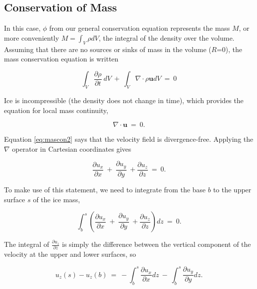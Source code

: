 \subsection{Conservation of Mass}

In this case, $\phi$ from our general conservation equation represents the mass $M$, or more conveniently
$M = \int_V \rho dV$, the integral of the density over the volume. Assuming that there are no sources or 
sinks of mass in the volume ($R$=0), the mass conservation equation is written

\begin{equation}
\int_{V}\frac{\partial \rho} {\partial t} ~dV ~+~ \int_{V} \nabla \cdot \rho \mathbf{u} dV~=~0
\label{eq:mascon1}
\end{equation}

\noindent
Ice is incompressible (the density does not change in time), which provides the equation for 
local mass continuity,

\begin{equation}
\nabla \cdot \mathbf{u} ~=~0.
\label{eq:mascon2}
\end{equation}

\noindent
Equation \eqref{eq:mascon2} says that the velocity field is divergence-free. Applying the $\nabla$ 
operator in Cartesian coordinates gives

\begin{equation}
\frac{\partial u_{x}}{\partial x}~+~\frac{\partial u_{y}}{\partial y} ~+\frac{\partial u_{z}}{\partial z}~=~0.  
\label{eq:mascon3}
\end{equation}

\noindent
To make use of this statement, we need to integrate from the base $b$ to the upper surface $s$ of the ice mass,

\begin{equation}
\int_{b}^{s} \left( \frac{\partial u_{x}}{\partial x}~+~\frac{\partial u_{y}}{\partial y} ~+\frac{\partial u_{z}}{\partial z}\right) dz~=~0.  
\label{eq:mascon4}
\end{equation}

\noindent
The integral of $\frac{\partial u_z}{\partial z}$ is simply the difference between
the vertical component of the velocity at the upper and lower surfaces, so

\begin{equation}
u_{z} \left(s\right)-u_{z} \left(b\right)~=~-\int_{b}^{s} \frac{\partial u_{x}}{\partial x} dz ~-~\int_{b}^{s} \frac{\partial u_{y}}{\partial y} dz.  
\label{eq:mascon5}
\end{equation}


